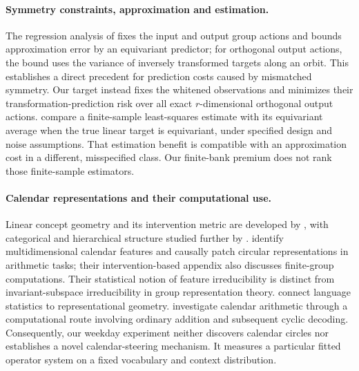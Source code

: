 \paragraph{Symmetry constraints, approximation and estimation.}
The regression analysis of \citet[Section~4.3, Theorem~4.9 and Corollary~4.10]{wang2023equivariance} fixes the input and output group actions and bounds approximation error by an equivariant predictor; for orthogonal output actions, the bound uses the variance of inversely transformed targets along an orbit. This establishes a direct precedent for prediction costs caused by mismatched symmetry. Our target instead fixes the whitened observations and minimizes their transformation-prediction risk over all exact $r$-dimensional orthogonal output actions. \citet[Theorem~13]{elesedy2021generalisation} compare a finite-sample least-squares estimate with its equivariant average when the true linear target is equivariant, under specified design and noise assumptions. That estimation benefit is compatible with an approximation cost in a different, misspecified class. Our finite-bank premium does not rank those finite-sample estimators.

\paragraph{Calendar representations and their computational use.}
Linear concept geometry and its intervention metric are developed by \citet{park2023linear}, with categorical and hierarchical structure studied further by \citet{park2025categorical}. \citet{engels2025notall} identify multidimensional calendar features and causally patch circular representations in arithmetic tasks; their intervention-based appendix also discusses finite-group computations. Their statistical notion of feature irreducibility is distinct from invariant-subspace irreducibility in group representation theory. \citet{karkada2026emergent} connect language statistics to representational geometry. \citet{feucht2026arithmetic} investigate calendar arithmetic through a computational route involving ordinary addition and subsequent cyclic decoding. Consequently, our weekday experiment neither discovers calendar circles nor establishes a novel calendar-steering mechanism. It measures a particular fitted operator system on a fixed vocabulary and context distribution.

